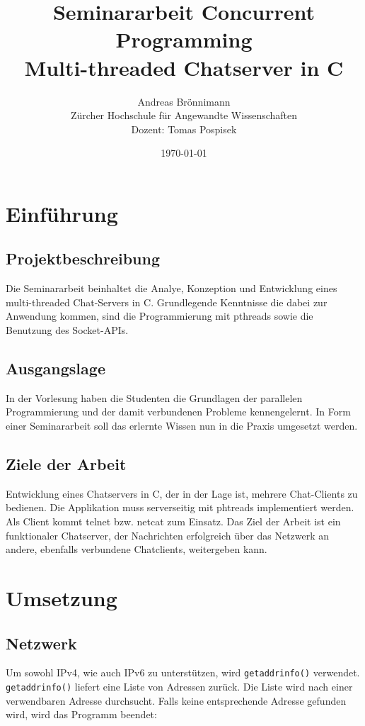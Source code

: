 \documentclass[a4paper]{article}
\title {Seminararbeit Concurrent Programming\\
Multi-threaded Chatserver in C\\}
\author {Andreas Brönnimann\\
Zürcher Hochschule für Angewandte Wissenschaften\\
Dozent: Tomas Pospisek}
\date {\today}
\begin{document}
\maketitle
\setcounter{page}{0}
\thispagestyle{empty}

\newpage

\setcounter{tocdepth}{3}
\tableofcontents

\newpage

\section{Einführung}
\subsection{Projektbeschreibung}
Die Seminararbeit beinhaltet die Analye, Konzeption und Entwicklung eines multi-threaded Chat-Servers in C. Grundlegende Kenntnisse die dabei zur Anwendung kommen, sind die Programmierung mit pthreads sowie die Benutzung des Socket-APIs.

\subsection{Ausgangslage}
In der Vorlesung haben die Studenten die Grundlagen der parallelen Programmierung und der damit verbundenen Probleme kennengelernt. In Form einer Seminararbeit soll das erlernte Wissen nun in die Praxis umgesetzt werden.

\subsection{Ziele der Arbeit}
Entwicklung eines Chatservers in C, der in der Lage ist, mehrere Chat-Clients zu bedienen. Die Applikation muss serverseitig mit phtreads implementiert werden. Als Client kommt telnet bzw. netcat zum Einsatz. Das Ziel der Arbeit ist ein funktionaler Chatserver, der Nachrichten erfolgreich über das Netzwerk an andere, ebenfalls verbundene Chatclients, weitergeben kann.

\section{Umsetzung}
\subsection{Netzwerk}
Um sowohl IPv4, wie auch IPv6 zu unterstützen, wird \texttt{getaddrinfo()} verwendet. \texttt{getaddrinfo()} liefert eine Liste von Adressen zurück. Die Liste wird nach einer verwendbaren Adresse durchsucht. Falls keine entsprechende Adresse gefunden wird, wird das Programm beendet:
\end{document}
